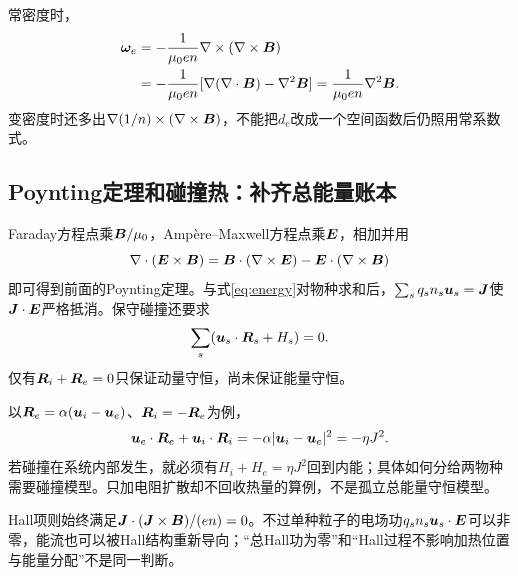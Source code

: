 常密度时，
\begin{align}
 \bm{\omega}_e
 &=-{1\over\mu_0en}\nabla\times(\nabla\times\bm{B})\\
 &=-{1\over\mu_0en}[\nabla(\nabla\cdot\bm{B})-\nabla^2\bm{B}]
 ={1\over\mu_0en}\nabla^2\bm{B}.
\end{align}
变密度时还多出$\nabla(1/n)\times(\nabla\times\bm{B})$，不能把$d_e$改成一个空间函数后仍照用常系数式。

\subsection{Poynting定理和碰撞热：补齐总能量账本}
Faraday方程点乘$\bm{B}/\mu_0$，Ampère--Maxwell方程点乘$\bm{E}$，相加并用
\begin{equation}
 \nabla\cdot(\bm{E}\times\bm{B})=\bm{B}\cdot(\nabla\times\bm{E})-\bm{E}\cdot(\nabla\times\bm{B})
\end{equation}
即可得到前面的Poynting定理。与式\eqref{eq:energy}对物种求和后，$\sum_s q_sn_s\bm{u}_s=\bm{J}$使$\bm{J}\cdot\bm{E}$严格抵消。保守碰撞还要求
\begin{equation}
 \sum_s(\bm{u}_s\cdot\bm{R}_s+H_s)=0.
\end{equation}
仅有$\bm{R}_i+\bm{R}_e=0$只保证动量守恒，尚未保证能量守恒。

以$\bm{R}_e=\alpha(\bm{u}_i-\bm{u}_e)$、$\bm{R}_i=-\bm{R}_e$为例，
\begin{equation}
 \bm{u}_e\cdot\bm{R}_e+\bm{u}_i\cdot\bm{R}_i
 =-\alpha|\bm{u}_i-\bm{u}_e|^2=-\eta J^2.
\end{equation}
若碰撞在系统内部发生，就必须有$H_i+H_e=\eta J^2$回到内能；具体如何分给两物种需要碰撞模型。只加电阻扩散却不回收热量的算例，不是孤立总能量守恒模型。

Hall项则始终满足$\bm{J}\cdot(\bm{J}\times\bm{B})/(en)=0$。不过单种粒子的电场功$q_sn_s\bm{u}_s\cdot\bm{E}$可以非零，能流也可以被Hall结构重新导向；“总Hall功为零”和“Hall过程不影响加热位置与能量分配”不是同一判断。
